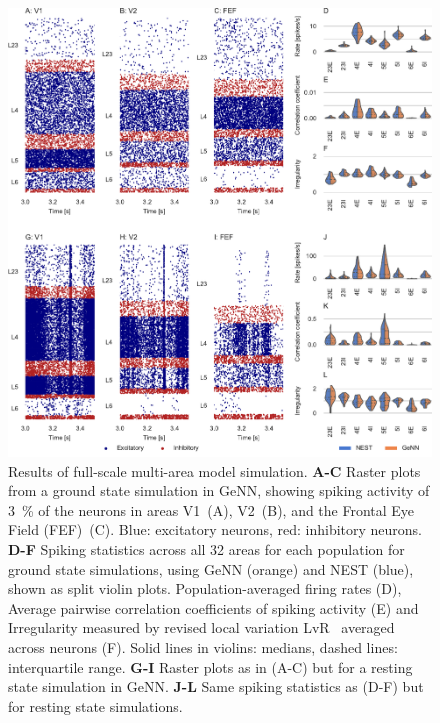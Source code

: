 \documentclass[9pt,a4paper]{amsart}
\newenvironment{fullwidth}{%
  \begin{adjustwidth}{-0.85in}{-0.85in}
}{\end{adjustwidth}}
\begin{document}
\begin{figure}
    \begin{fullwidth}
        \centering
        \includegraphics{figures/multi_area}
        \captionsetup{width=6.69in}
        \caption{Results of full-scale multi-area model simulation. 
        \textbf{A-C} Raster plots from a ground state simulation in GeNN, showing spiking activity of \SI{3}{\percent} of the neurons in areas V1~(A), V2~(B), and the Frontal Eye Field (FEF)~(C). Blue: excitatory neurons, red: inhibitory neurons.        
        \textbf{D-F} Spiking statistics across all 32 areas for each population for ground state simulations, using GeNN (orange) and NEST (blue), shown as split violin plots. Population-averaged firing rates (D), Average pairwise correlation coefficients of spiking activity (E) and Irregularity measured by revised local variation LvR~\citep{Shinomoto2009} averaged across neurons (F). Solid lines in violins: medians, dashed lines: interquartile range.
                \textbf{G-I} Raster plots as in (A-C) but for a resting state simulation in GeNN.
        \textbf{J-L} Same spiking statistics as (D-F) but for resting state simulations.}
        \label{fig:multi_area}
    \end{fullwidth}
\end{figure}
\end{document}
